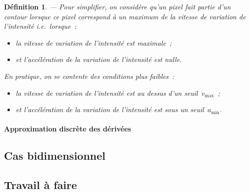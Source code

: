 \documentclass[a4paper]{article}
\newtheorem{definition}{D\'efinition}
\begin{document}
\begin{definition} ---
  Pour simplifier, on consid\`ere qu'un pixel fait partie d'un
  contour lorsque ce pixel correspond \`a un maximum de la vitesse de
  variation de l'intensit\'e i.e.\ lorsque~:
  \begin{itemize}
  \item la vitesse de variation de l'intensit\'e est maximale~;
  \item et l'acc\'el\'eration de la variation de l'intensit\'e est nulle.
  \end{itemize}
  En pratique, on se contente des conditions plus faibles~:
  \begin{itemize}
  \item la vitesse de variation de l'intensit\'e est au dessus d'un
    seuil~$v_{\mathrm{max}}$~;
  \item et l'acc\'el\'eration de la variation de l'intensit\'e est
    sous un seuil~$a_{\mathrm{min}}$.
  \end{itemize}
\end{definition}
\paragraph{Approximation discr\`ete des d\'eriv\'ees}
\subsection{Cas bidimensionnel}

\subsection{Travail \`a faire}
\end{document}
